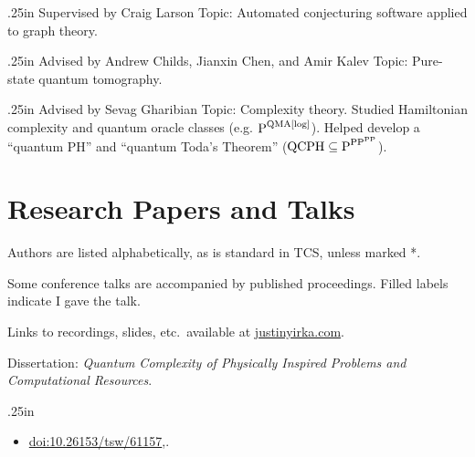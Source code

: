 \documentclass[11pt,letterpaper,serif]{moderncv}
\begin{document}
{
	\begin{adjustwidth}{.25in}{}
		Supervised by Craig Larson \newline
		Topic: Automated conjecturing software applied to graph theory.
	\end{adjustwidth}
}

{}{}{}
{
	\begin{adjustwidth}{.25in}{}
		Advised by Andrew Childs, Jianxin Chen, and Amir Kalev \newline
		Topic: Pure-state quantum tomography.
	\end{adjustwidth}
}

\newpage
{}
{
	\begin{adjustwidth}{.25in}{}
		Advised by Sevag Gharibian \newline
		Topic: Complexity theory. Studied Hamiltonian complexity and quantum oracle classes  (e.g. {\scriptsize $\textup{P}^{\textup{QMA[log]}}$}). Helped develop a ``quantum PH'' and ``quantum Toda's Theorem'' ({\scriptsize $\textup{QCPH}\subseteq \textup{P}^{\textup{PP}^{\textup{PP}}}$}).
	\end{adjustwidth}
}

\section{Research Papers and Talks}
\vspace{-.1in}
{\footnotesize
	Authors are listed alphabetically, as is standard in TCS, unless marked *.

	Some conference talks are accompanied by published proceedings.
	Filled labels \textbullet{} indicate I gave the talk.

	Links to recordings, slides, etc.\ available at \href{https://www.justinyirka.com/}{justinyirka.com}.

}
\medskip

Dissertation: \textit{Quantum Complexity of Physically Inspired Problems and Computational Resources}.
\begin{adjustwidth}{.25in}{}
	\begin{itemize}
		\item[--] \href{https://doi.org/10.26153/tsw/61157}{doi:10.26153/tsw/61157},.
	\end{itemize}
\end{adjustwidth}
\medskip
\end{document}

